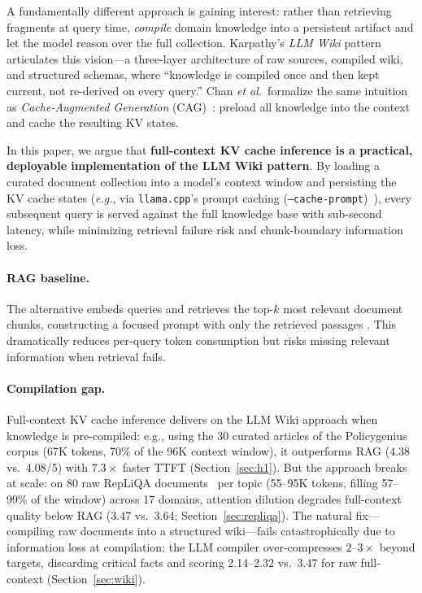 \documentclass{article}
\begin{document}
A fundamentally different approach is gaining interest: rather than
retrieving fragments at query time, \emph{compile} domain knowledge into a
persistent artifact and let the model reason over the full collection.
Karpathy's \emph{LLM Wiki} pattern~\cite{karpathy2026llmwiki} articulates this
vision---a three-layer architecture of raw sources, compiled wiki, and
structured schemas, where ``knowledge is compiled once and then kept current,
not re-derived on every query.'' Chan \emph{et al.}\ formalize the same intuition
as \emph{Cache-Augmented Generation} (CAG)~\cite{chan2024cag}: preload all
knowledge into the context and cache the resulting KV states.

In this paper, we argue that \textbf{full-context KV cache inference is a
practical, deployable implementation of the LLM Wiki pattern}. By loading a
curated document collection into a model's context window and persisting
the KV cache states (\emph{e.g.}, via \texttt{llama.cpp}'s prompt caching
(\texttt{--cache-prompt})~\cite{llamacpp2024}), every subsequent query is
served against the full knowledge base with sub-second latency, while minimizing
retrieval failure risk and chunk-boundary information loss.

\paragraph{RAG baseline.}
The alternative embeds queries and retrieves the top-$k$ most relevant document
chunks, constructing a focused prompt with only the retrieved passages
\cite{lewis2020retrieval,karpukhin2020dense}. This dramatically reduces
per-query token consumption but risks missing relevant information when
retrieval fails.

\paragraph{Compilation gap.}
Full-context KV cache inference delivers on the LLM Wiki approach when
knowledge is pre-compiled: e.g., using the 30 curated articles of the Policygenius corpus (67K
tokens, 70\% of the 96K context window), it outperforms RAG (4.38 vs.\
4.08/5) with $7.3\times$ faster TTFT (Section~\ref{sec:h1}). But the
approach breaks at scale: on 80 raw RepLiQA
documents~\cite{montero2024repliqa} per topic (55--95K tokens, filling
57--99\% of the window) across 17 domains,
attention dilution degrades full-context quality below RAG (3.47 vs.\
3.64; Section~\ref{sec:repliqa}). The natural fix---compiling raw
documents into a structured wiki---fails catastrophically due to information loss at compilation: the LLM
compiler over-compresses $2$--$3\times$ beyond targets, discarding
critical facts and scoring 2.14--2.32 vs.\ 3.47 for raw full-context
(Section~\ref{sec:wiki}).
\end{document}
